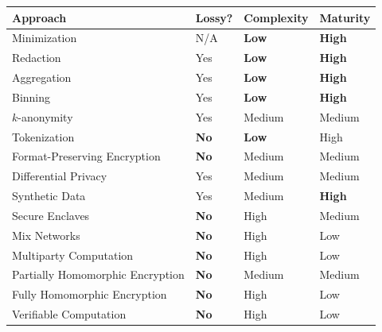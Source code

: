 \documentclass[nobib]{tufte-handout}
\begin{document}
\begin{table}[ht]
  \centering
  \selectfont
  \begin{tabular}{llll}
    \toprule
    Approach & Lossy? & Complexity & Maturity \\
    \midrule
    Minimization & N/A & \textbf{Low} & \textbf{High} \\
    Redaction & Yes & \textbf{Low} & \textbf{High} \\
    Aggregation & Yes & \textbf{Low} & \textbf{High}  \\
    Binning & Yes & \textbf{Low} & \textbf{High} \\
    $k$-anonymity & Yes & Medium & Medium  \\
    Tokenization & \textbf{No} & \textbf{Low} & High  \\
    Format-Preserving Encryption & \textbf{No} & Medium & Medium \\
    Differential Privacy & Yes & Medium & Medium \\
    Synthetic Data & Yes & Medium & \textbf{High} \\
    Secure Enclaves & \textbf{No} & High & Medium \\
    Mix Networks & \textbf{No} & High & Low \\
    Multiparty Computation & \textbf{No} & High & Low \\
    Partially Homomorphic Encryption & \textbf{No} & Medium & Medium \\
    Fully Homomorphic Encryption & \textbf{No} & High & Low \\
    Verifiable Computation & \textbf{No} & High & Low \\
    \bottomrule
  \end{tabular}
  \label{tab:normaltab}
\end{table}

 
\end{document}
